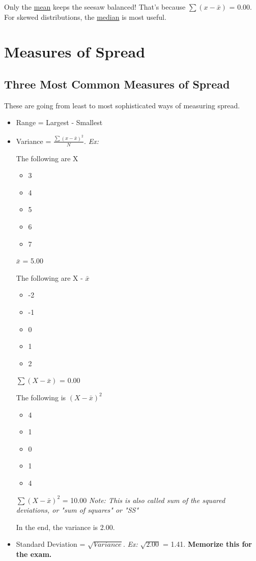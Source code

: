 \documentclass[11pt]{report}
\begin{document}
Only the \underline{mean} keeps the seesaw balanced! That's because $\sum(x - \bar{x})$ = 0.00. 
For skewed distributions, the \underline{median} is most useful.

\section{Measures of Spread}

\subsection{Three Most Common Measures of Spread}
These are going from least to most sophisticated ways of measuring spread.
\begin{itemize}
    \item Range = Largest - Smallest
    \item Variance = $\frac{\sum(x - \bar{x})^2}{N}$. \textit{Ex: }
    \begin{multicols}{3}
        The following are X
        \begin{itemize}
            \item 3
            \item 4
            \item 5
            \item 6
            \item 7
        \end{itemize}
        $\bar{x}$ = 5.00

        \columnbreak
        The following are X - $\bar{x}$
        \begin{itemize}
            \item -2
            \item -1
            \item 0
            \item 1
            \item 2
        \end{itemize}
        $\sum(X - \bar{x})$ = 0.00

        \columnbreak
        The following is $(X - \bar{x})^2$
        \begin{itemize}
            \item 4
            \item 1
            \item 0
            \item 1
            \item 4
        \end{itemize}
        $\sum(X - \bar{x})^2$ = 10.00 \textit{Note: This is also called sum of the squared deviations, or "sum of squares" or "SS"}
    \end{multicols}
    In the end, the variance is 2.00.
    \item Standard Deviation = $\sqrt{Variance}$. \textit{Ex: } $\sqrt{2.00}$ = 1.41. \textbf{Memorize this for the exam.}
\end{itemize}
\end{document}

